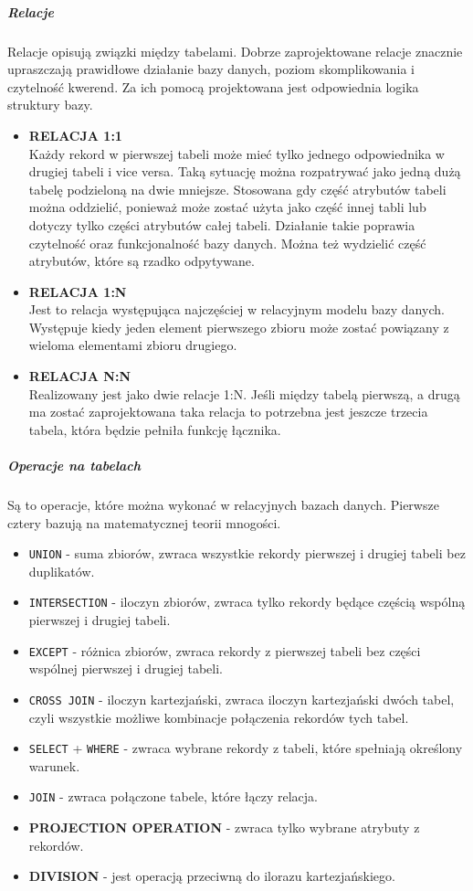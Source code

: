 \documentclass[polish, 11pt]{article}
\begin{document}
  	 	\subparagraph{Relacje\\}
  	 	Relacje opisują związki między tabelami. Dobrze zaprojektowane relacje znacznie upraszczają prawidłowe działanie bazy danych,
  	 	poziom skomplikowania i czytelność kwerend. Za ich pomocą projektowana jest odpowiednia logika struktury bazy.
  	 	\begin{itemize}
  	 	\item \textbf{RELACJA 1:1}\\
  	 	Każdy rekord w pierwszej tabeli może mieć tylko jednego odpowiednika w drugiej tabeli i vice versa. 
  	 	Taką sytuację można rozpatrywać jako jedną dużą tabelę podzieloną na dwie mniejsze. Stosowana gdy 
  	 	część atrybutów tabeli można oddzielić, ponieważ może zostać użyta jako część innej tabli lub dotyczy 
  	 	tylko części atrybutów całej tabeli. Działanie takie poprawia czytelność oraz funkcjonalność bazy danych. Można 
           też wydzielić część atrybutów, które są rzadko odpytywane.
    \newpage
  	 	\item \textbf{RELACJA 1:N}\\
  	 	Jest to relacja występująca najczęściej w relacyjnym modelu bazy danych. Występuje kiedy jeden element pierwszego 
  	 	zbioru może zostać powiązany z wieloma elementami zbioru drugiego. 
  	 	\item \textbf{RELACJA N:N}\\
  	 	Realizowany jest jako dwie relacje 1:N. Jeśli między tabelą pierwszą, a drugą ma zostać zaprojektowana taka relacja to potrzebna jest jeszcze 
  	 	trzecia tabela, która będzie pełniła funkcję łącznika. 
  	 	\end{itemize}
  	 	\subparagraph{Operacje na tabelach\\}
  	 	Są to operacje, które można wykonać w relacyjnych bazach danych. Pierwsze cztery bazują na matematycznej teorii mnogości.
  	 	\begin{itemize}
  	 	\item \texttt{UNION} - suma zbiorów, zwraca wszystkie rekordy pierwszej i drugiej tabeli bez duplikatów.
  	 	\item \texttt{INTERSECTION} - iloczyn zbiorów, zwraca tylko rekordy będące częścią wspólną pierwszej i drugiej tabeli.
  	 	\item \texttt{EXCEPT} - różnica zbiorów, zwraca rekordy z pierwszej tabeli bez części wspólnej pierwszej i drugiej tabeli.
  	 	\item \texttt{CROSS JOIN} - iloczyn kartezjański, zwraca iloczyn kartezjański dwóch tabel, czyli wszystkie możliwe kombinacje połączenia
  	 	rekordów tych tabel.
  	 	\item \texttt{SELECT} + \texttt{WHERE} - zwraca wybrane rekordy z tabeli, które spełniają określony warunek.
  	 	\item \texttt{JOIN} - zwraca połączone tabele, które łączy relacja.
  	 	\item \textbf{PROJECTION OPERATION} - zwraca tylko wybrane atrybuty z rekordów.
  	 	\item \textbf{DIVISION} - jest operacją przeciwną do ilorazu kartezjańskiego.
  	 	\end{itemize}
  		
\end{document}
